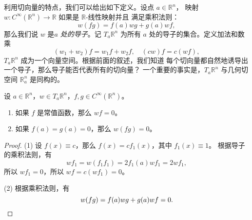 \documentclass[fontset=none]{Notes}
\begin{document}
利用切向量的特点，我们可以给出如下定义。设点 $a\in\mathbb{R}^n$，
映射 $w:C^\infty(\mathbb{R}^n)\to\mathbb{R}$ 如果是 $\mathbb{R}$-线性映射并且
满足乘积法则：
\[
  w(fg)=f(a)wg+g(a)wf, 
\]
那么我们说 $w$ 是\emph{$a$ 处的导子}。记 $T_a\mathbb{R}^n$ 为所有
$a$ 处的导子的集合。定义加法和数乘
\[
  (w_1+w_2)f=w_1f+w_2f,\quad (cw)f=c(wf),
\]
$T_a\mathbb{R}^n$ 成为一个向量空间。根据前面的叙述，我们知道
每个切向量都自然地诱导出一个导子，那么导子能否代表所有的切向量？
一个重要的事实是，$T_a\mathbb{R}^n$ 与几何切空间 $\mathbb{R}_a^n$
是同构的。

\begin{lemma}[导子的性质]\label{lemma:property of derivation}
  设 $a\in\mathbb{R}^n$，$w\in T_a\mathbb{R}^n$，$f,g\in C^\infty(\mathbb{R}^n)$。
  \begin{enumerate}
    \item 如果 $f$ 是常值函数，那么 $wf=0$。
    \item 如果 $f(a)=g(a)=0$，那么 $w(fg)=0$。
  \end{enumerate}
\end{lemma}
\begin{proof}
  (1) 设 $f(x)\equiv c$，那么 $f(x)=cf_1(x)$，其中 $f_1(x)\equiv 1$。
  根据导子的乘积法则，有
  \[
    wf_1=w(f_1f_1)=2f_1(a)wf_1=2wf_1,
  \]
  所以 $wf_1=0$，所以 $wf=c(wf_1)=0$。

  (2) 根据乘积法则，有
  \[
    w(fg)=f(a)wg+g(a)wf=0.\qedhere  
  \]
\end{proof}
\end{document}
